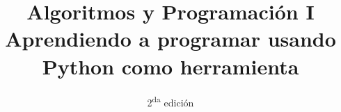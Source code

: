\documentclass[11pt,spanish,a4paper,twoside,openany]{book}
\theoremstyle{definition}
\theoremstyle{definition}
\theoremstyle{remark}
\begin{document}
\title{{\bf Algoritmos y Programación I} \\ Aprendiendo a programar usando Python como herramienta}
\date{2\textsuperscript{da} edición}
\maketitle

\tableofcontents






















\begin{extract}

\end{extract}


\end{document}
